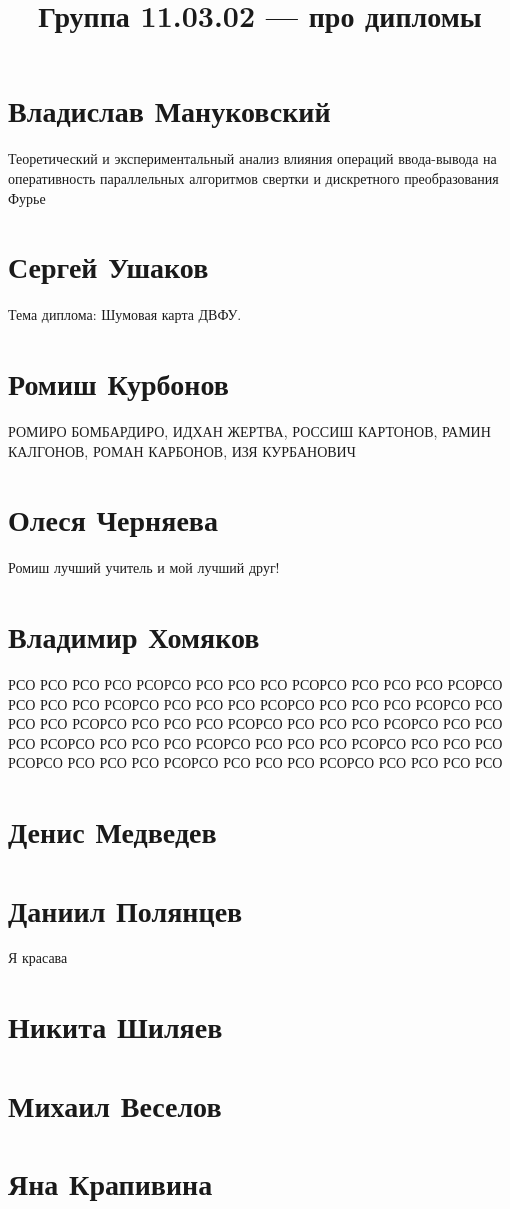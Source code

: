 \documentclass{article}
\title{Группа 11.03.02 --- про дипломы}
\begin{document}
\section*{Владислав Мануковский}
Теоретический и экспериментальный анализ влияния операций ввода-вывода на оперативность параллельных алгоритмов свертки и дискретного преобразования Фурье

\section*{Сергей Ушаков}

Тема диплома: Шумовая карта ДВФУ.

\section*{Ромиш Курбонов}

РОМИРО БОМБАРДИРО, ИДХАН ЖЕРТВА, РОССИШ КАРТОНОВ, РАМИН КАЛГОНОВ, РОМАН КАРБОНОВ, ИЗЯ КУРБАНОВИЧ

\section*{Олеся Черняева}
Ромиш лучший учитель и мой лучший друг!

\section*{Владимир Хомяков}
РСО РСО РСО РСО РСОРСО РСО РСО РСО РСОРСО РСО РСО РСО РСОРСО РСО РСО РСО РСОРСО РСО РСО РСО РСОРСО РСО РСО РСО РСОРСО РСО РСО РСО РСОРСО РСО РСО РСО РСОРСО РСО РСО РСО РСОРСО РСО РСО РСО РСОРСО РСО РСО РСО РСОРСО РСО РСО РСО РСОРСО РСО РСО РСО РСОРСО РСО РСО РСО РСОРСО РСО РСО РСО РСОРСО РСО РСО РСО РСО
\section*{Денис Медведев}

\section*{Даниил Полянцев}
Я красава

\section*{Никита Шиляев}

\section*{Михаил Веселов}

\section*{Яна Крапивина}
\end{document}
